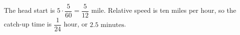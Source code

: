 The head start is $5\cdot\dfrac{5}{60}=\dfrac{5}{12}$ mile. Relative speed is ten miles per hour, so the catch-up time is $\dfrac{1}{24}$ hour, or $\boxed{2.5\text{ minutes}}$.
